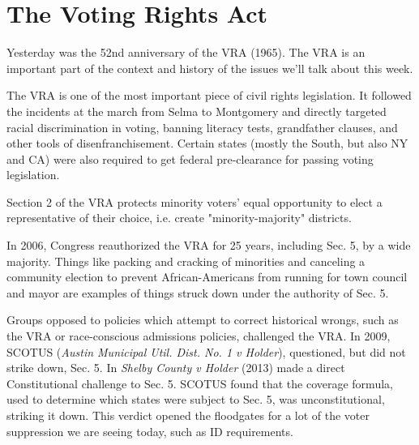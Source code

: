



\section*{The Voting Rights Act}

Yesterday was the 52nd anniversary of the VRA (1965).  The VRA is an important part of the context and history of the issues we'll talk about this week.

The VRA is one of the most important piece of civil rights legislation.  It followed the incidents at the march from Selma to Montgomery and directly targeted racial discrimination in voting, banning literacy tests, grandfather clauses, and other tools of disenfranchisement.  Certain states (mostly the South, but also NY and CA) were also required to get federal pre-clearance for passing voting legislation.

Section 2 of the VRA protects minority voters' equal opportunity to elect a representative of their choice, i.e. create "minority-majority" districts.

In 2006, Congress reauthorized the VRA for 25 years, including Sec. 5, by a wide majority.  Things like packing and cracking of minorities and canceling a community election to prevent African-Americans from running for town council and mayor are examples of things struck down under the authority of Sec. 5.

Groups opposed to policies which attempt to correct historical wrongs, such as the VRA or race-conscious admissions policies, challenged the VRA.  In 2009, SCOTUS (\textit{Austin Municipal Util. Dist. No. 1 v Holder}), questioned, but did not strike down, Sec. 5.  In \textit{Shelby County v Holder} (2013) made a direct Constitutional challenge to Sec. 5.  SCOTUS found that the coverage formula, used to determine which states were subject to Sec. 5, was unconstitutional, striking it down.  This verdict opened the floodgates for a lot of the voter suppression we are seeing today, such as ID requirements.  

